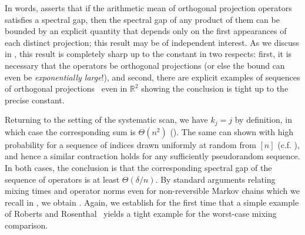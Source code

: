 \documentclass[11pt]{article}
\begin{document}
In words,  asserts that if the arithmetic mean of orthogonal projection operators satisfies a spectral gap, then the spectral gap of any product of them can be bounded by an explicit quantity that depends only on the first appearances of each distinct projection; this result may be of independent interest. As we discuss in , this result is completely sharp up to the constant in two respects: first, it is necessary that the operators be orthogonal projections (or else the bound can even be \emph{exponentially large}!), and second, there are explicit examples of sequences of orthogonal projections~\cite{DBLP:journals/jmlr/RechtR12} even in $\mathbb{R}^2$ showing the conclusion is tight up to the precise constant.

Returning to the setting of the systematic scan, we have $k_j=j$ by definition, in which case the corresponding sum is $\Theta(n^2)$ (). The same can shown with high probability for a sequence of indices drawn uniformly at random from $[n]$ (c.f. ), and hence a similar contraction holds for any sufficiently pseudorandom sequence. In both cases, the conclusion is that the corresponding spectral gap of the sequence of operators is at least $\Theta(\delta/n)$. By standard arguments relating mixing times and operator norms even for non-reversible Markov chains which we recall in , we obtain 
. Again, we establish for the first time that a simple example of Roberts and Rosenthal~\cite{roberts2015surprising} yields a tight example for the worst-case mixing comparison. 
\end{document}
